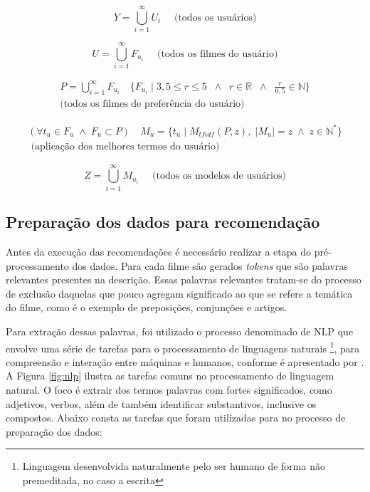 \begin{equation}
	Y = \bigcup\limits_{i=1}^{\infty} U_i \quad \text{ (todos os usuários)}
\label{eq:user_model1}
\end{equation}

\begin{equation}
	U = \bigcup\limits_{i=1}^{\infty} F_{u_i} \quad \text{ (todos os filmes do usuário)}
\label{eq:user_model2}
\end{equation}

\begin{equation}
	\begin{aligned}
		P = \bigcup\limits_{i=1}^{\infty} F_{u_i} \quad \{F_{u_i} \;|\; 3,5 \leq r \leq 5 \;\;\land\;\; r \in \mathbb{R} \;\;\land\;\; \frac{r}{0,5} \in \mathbb{N}\}\\
		\text{(todos os filmes de preferência do usuário)}
	\end{aligned}
\label{eq:user_model3}
\end{equation}

\begin{equation}
	\begin{aligned}
		(\forall t_u \in F_u \;\land\; F_u \subset P) \quad M_u = \{t_u \;| \; M_{tfidf}(P, z), \; |M_u| = z \; \land \; z \in \mathbb{N}^*\} \\
		\text{ (aplicação dos melhores termos do usuário)}
	\end{aligned}
\end{equation}

\begin{equation}
	Z = \bigcup\limits_{i=1}^{\infty} M_{u_i} \quad \text{ (todos os modelos de usuários)}
\label{eq:user_model5}
\end{equation}

\subsection{Preparação dos dados para recomendação}
\label{ssec:data_nlp}

Antes da execução das recomendações é necessário realizar a etapa do pré-processamento dos dados. Para cada filme são gerados \textit{tokens} que são palavras relevantes presentes na descrição. Essas palavras relevantes tratam-se do processo de exclusão daquelas que pouco agregam significado ao que se refere a temática do filme, como é o exemplo de preposições, conjunções e artigos.

Para extração dessas palavras, foi utilizado o processo denominado de \ac{NLP} que envolve uma série de tarefas para o processamento de linguagens naturais \footnote{Linguagem desenvolvida naturalmente pelo ser humano de forma não premeditada, no caso a escrita}, para compreensão e interação entre máquinas e humanos, conforme é apresentado por \cite{Collobert:2011}. A Figura \ref{fig:nlp} ilustra as tarefas comuns no processamento de linguagem natural. O foco é extrair dos termos palavras com fortes significados, como adjetivos, verbos, além de também identificar substantivos, inclusive os compostos. Abaixo consta as tarefas que foram utilizadas para no processo de preparação dos dados:

